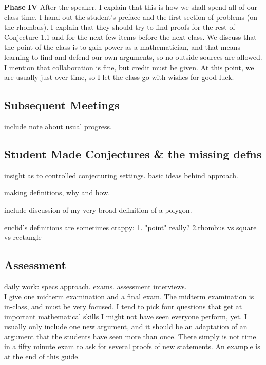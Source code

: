 \documentclass{tufte-handout}
\theoremstyle{definition}
\begin{document}
\begin{compactdesc}
\item[\textbf{Phase IV}] After the speaker, I explain that this is how we shall spend all of our class time.
I hand out the student's preface and the first section of problems (on the rhombus).
I explain that they should try to find proofs for the rest of Conjecture 1.1 and for the next few items before the next class.
We discuss that the point of the class is to gain power as a mathematician, and that means learning to find and defend our own arguments, so no outside sources are allowed.
I mention that collaboration is fine, but credit must be given.
At this point, we are usually just over time, so I let the class go with wishes for good luck.\\[.1in]
\end{compactdesc}

\subsection{Subsequent Meetings}

include note about usual progress.

\subsection{Student Made Conjectures \& the missing defns}

insight as to controlled conjecturing settings. basic ideas behind approach.


making definitions, why and how. 

include discussion of my very broad definition of a polygon.

euclid's definitions are sometimes crappy:
1. "point" really?
2.rhombus vs square vs rectangle




\subsection{Assessment}

daily work: specs approach. exams. assessment interviews.\\


I give one midterm examination and a final exam.
The midterm examination is in-class, and must be very focused.
I tend to pick four questions that get at important mathematical skills I might not have seen everyone perform, yet.
I usually only include one new argument, and it should be an adaptation of an argument that the students have seen more than once.
There simply is not time in a fifty minute exam to ask for several proofs of new statements.
An example is at the end of this guide.
\end{document}
